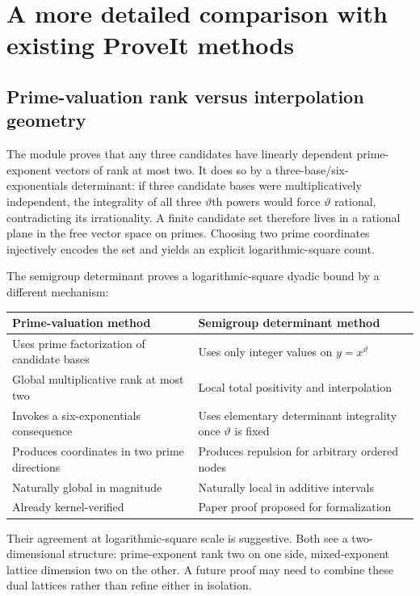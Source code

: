 \documentclass[11pt,oneside]{article}
\theoremstyle{definition}
\theoremstyle{remark}
\newcommand{\thetaq}{\vartheta}
\begin{document}
\section{A more detailed comparison with existing ProveIt methods}
\label{sec:comparison}

\subsection{Prime-valuation rank versus interpolation geometry}

The module  proves that any three candidates have linearly
dependent prime-exponent vectors of rank at most two.  It does so by a three-base/six-
exponentials determinant: if three candidate bases were multiplicatively independent, the
integrality of all three $\thetaq$th powers would force $\thetaq$ rational, contradicting its
irrationality.  A finite candidate set therefore lives in a rational plane in the free vector
space on primes.  Choosing two prime coordinates injectively encodes the set and yields an
explicit logarithmic-square count.

The semigroup determinant proves a logarithmic-square dyadic bound by a different mechanism:

\begin{center}
\begin{tabular}{p{}p{}}
\toprule
Prime-valuation method & Semigroup determinant method \\
\midrule
Uses prime factorization of candidate bases & Uses only integer values on $y=x^{\thetaq}$ \\
Global multiplicative rank at most two & Local total positivity and interpolation \\
Invokes a six-exponentials consequence & Uses elementary determinant integrality once
$\thetaq$ is fixed \\
Produces coordinates in two prime directions & Produces repulsion for arbitrary ordered nodes \\
Naturally global in magnitude & Naturally local in additive intervals \\
Already kernel-verified & Paper proof proposed for formalization \\
\bottomrule
\end{tabular}
\end{center}

Their agreement at logarithmic-square scale is suggestive.  Both see a two-dimensional
structure: prime-exponent rank two on one side, mixed-exponent lattice dimension two on the
other.  A future proof may need to combine these dual lattices rather than refine either in
isolation.
\end{document}
